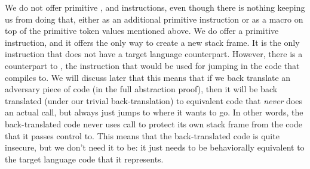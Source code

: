 \documentclass[a4paper]{article}
\begin{document}
We do not offer primitive \sreturn{}, \spush{} and \spop{} instructions, even though there is nothing keeping us from doing that, either as an additional primitive instruction or as a macro on top of the primitive token values mentioned above.
We do offer a primitive \scall{\offpc,\offsigma}{}{} instruction, and it offers the only way to create a new stack frame.
It is the only instruction that does not have a target language counterpart.
However, there is a counterpart to \sxjmp{}{}, the instruction that would be used for jumping in the code that \scall{\offpc,\offsigma}{}{} compiles to.
We will discuss later that this means that if we back translate an adversary piece of code (in the full abstraction proof), then it will be back translated (under our trivial back-translation) to equivalent code that \emph{never} does an actual call, but always just jumps to where it wants to go.
In other words, the back-translated code never uses call to protect its own stack frame from the code that it passes control to.
This means that the back-translated code is quite insecure, but we don't need it to be: it just needs to be behaviorally equivalent to the target language code that it represents.

\end{document}
